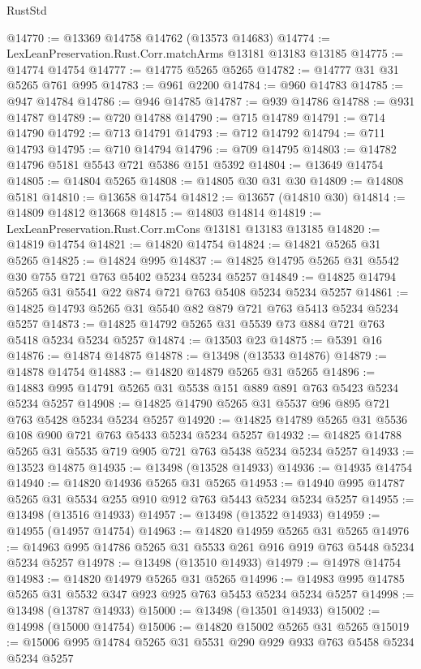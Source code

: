 \begin{lexlean}{RustStd}
\begin{coremodule}
@14770 := @13369 @14758 @14762 (@13573 @14683)
@14774 := LexLeanPreservation.Rust.Corr.matchArms @13181 @13183 @13185
@14775 := @14774 @14754
@14777 := @14775 @5265 @5265
@14782 := @14777 @31 @31 @5265 @761 @995
@14783 := @961 @2200
@14784 := @960 @14783
@14785 := @947 @14784
@14786 := @946 @14785
@14787 := @939 @14786
@14788 := @931 @14787
@14789 := @720 @14788
@14790 := @715 @14789
@14791 := @714 @14790
@14792 := @713 @14791
@14793 := @712 @14792
@14794 := @711 @14793
@14795 := @710 @14794
@14796 := @709 @14795
@14803 := @14782 @14796 @5181 @5543 @721 @5386 @151 @5392
@14804 := @13649 @14754
@14805 := @14804 @5265
@14808 := @14805 @30 @31 @30
@14809 := @14808 @5181
@14810 := @13658 @14754
@14812 := @13657 (@14810 @30)
@14814 := @14809 @14812 @13668
@14815 := @14803 @14814
@14819 := LexLeanPreservation.Rust.Corr.mCons @13181 @13183 @13185
@14820 := @14819 @14754
@14821 := @14820 @14754
@14824 := @14821 @5265 @31 @5265
@14825 := @14824 @995
@14837 := @14825 @14795 @5265 @31 @5542 @30 @755 @721 @763 @5402 @5234 @5234 @5257
@14849 := @14825 @14794 @5265 @31 @5541 @22 @874 @721 @763 @5408 @5234 @5234 @5257
@14861 := @14825 @14793 @5265 @31 @5540 @82 @879 @721 @763 @5413 @5234 @5234 @5257
@14873 := @14825 @14792 @5265 @31 @5539 @73 @884 @721 @763 @5418 @5234 @5234 @5257
@14874 := @13503 @23
@14875 := @5391 @16
@14876 := @14874 @14875
@14878 := @13498 (@13533 @14876)
@14879 := @14878 @14754
@14883 := @14820 @14879 @5265 @31 @5265
@14896 := @14883 @995 @14791 @5265 @31 @5538 @151 @889 @891 @763 @5423 @5234 @5234 @5257
@14908 := @14825 @14790 @5265 @31 @5537 @96 @895 @721 @763 @5428 @5234 @5234 @5257
@14920 := @14825 @14789 @5265 @31 @5536 @108 @900 @721 @763 @5433 @5234 @5234 @5257
@14932 := @14825 @14788 @5265 @31 @5535 @719 @905 @721 @763 @5438 @5234 @5234 @5257
@14933 := @13523 @14875
@14935 := @13498 (@13528 @14933)
@14936 := @14935 @14754
@14940 := @14820 @14936 @5265 @31 @5265
@14953 := @14940 @995 @14787 @5265 @31 @5534 @255 @910 @912 @763 @5443 @5234 @5234 @5257
@14955 := @13498 (@13516 @14933)
@14957 := @13498 (@13522 @14933)
@14959 := @14955 (@14957 @14754)
@14963 := @14820 @14959 @5265 @31 @5265
@14976 := @14963 @995 @14786 @5265 @31 @5533 @261 @916 @919 @763 @5448 @5234 @5234 @5257
@14978 := @13498 (@13510 @14933)
@14979 := @14978 @14754
@14983 := @14820 @14979 @5265 @31 @5265
@14996 := @14983 @995 @14785 @5265 @31 @5532 @347 @923 @925 @763 @5453 @5234 @5234 @5257
@14998 := @13498 (@13787 @14933)
@15000 := @13498 (@13501 @14933)
@15002 := @14998 (@15000 @14754)
@15006 := @14820 @15002 @5265 @31 @5265
@15019 := @15006 @995 @14784 @5265 @31 @5531 @290 @929 @933 @763 @5458 @5234 @5234 @5257

\end{coremodule}
\end{lexlean}
